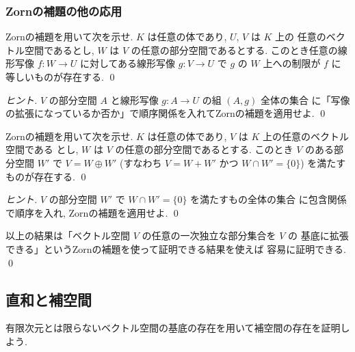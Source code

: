 \documentclass[12pt,twoside]{jarticle}
\begin{document}

\subsubsection{Zornの補題の他の応用}

\begin{question}[10点]
  Zornの補題を用いて次を示せ. $K$ は任意の体であり, $U$, $V$ は $K$ 上の
  任意のベクトル空間であるとし, $W$ は $V$ の任意の部分空間であるとする.
  このとき任意の線形写像 $f:W\to U$ に対してある線形写像 $g:V\to U$ 
  で $g$ の $W$ 上への制限が $f$ に等しいものが存在する.
  \qed
\end{question}

\begin{proof}[ヒント]
  $V$ の部分空間 $A$ と線形写像 $g:A\to U$ の組 $(A,g)$ 全体の集合
  に「写像の拡張になっているか否か」で順序関係を入れてZornの補題を適用せよ.
  \qed
\end{proof}

\begin{question}[10点]
  Zornの補題を用いて次を示せ. 
  $K$ は任意の体であり, $V$ は $K$ 上の任意のベクトル空間である
  とし, $W$ は $V$ の任意の部分空間であるとする.
  このとき $V$ のある部分空間 $W'$ で $V=W\oplus W'$ 
  (すなわち $V=W+W'$ かつ $W\cap W'=\{0\}$) を満たすものが存在する.
  \qed
\end{question}

\begin{proof}[ヒント]
  $V$ の部分空間 $W'$ で $W\cap W'=\{0\}$ を満たすもの全体の集合
  に包含関係で順序を入れ, Zornの補題を適用せよ.
  \qed
\end{proof}

\begin{rem}
  以上の結果は「ベクトル空間 $V$ の任意の一次独立な部分集合を $V$ の
  基底に拡張できる」というZornの補題を使って証明できる結果を使えば
  容易に証明できる.
  \qed
\end{rem}


\subsection{直和と補空間}

有限次元とは限らないベクトル空間の基底の存在を用いて補空間の存在を証明しよう.
\end{document}
